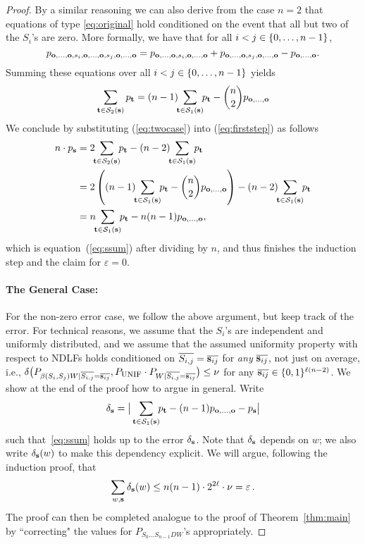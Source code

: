 \begin{proof}
By a similar reasoning we can also derive
from the case $n=2$ that equations of type \eqref{eq:original} hold
conditioned on the event that all but two of the $S_i$'s are zero. More
formally, we have that for all $i < j \in \{0,\ldots,n-1\}$,
\begin{equation}\label{eq:zeros}
p_{\text{\boldmath${\bf o}$},\ldots,\text{\boldmath${\bf o}$},s_i,\text{\boldmath${\bf o}$},\ldots,\text{\boldmath${\bf o}$},s_j,\text{\boldmath${\bf o}$},\ldots,\text{\boldmath${\bf o}$}} =
p_{\text{\boldmath${\bf o}$},\ldots,\text{\boldmath${\bf o}$},s_i,\text{\boldmath${\bf o}$},\ldots,\text{\boldmath${\bf o}$}} +
p_{\text{\boldmath${\bf o}$},\ldots,\text{\boldmath${\bf o}$},s_j,\text{\boldmath${\bf o}$},\ldots,\text{\boldmath${\bf o}$}} - p_{\text{\boldmath${\bf o}$},\ldots,\text{\boldmath${\bf o}$}}.
\end{equation}
Summing these equations over all $i < j \in \{0,\ldots,n-1\}$
yields
\begin{equation} \label{eq:twocase}
\sum_{\text{\boldmath${\bf t}$} \in {\cal S}_2(\text{\boldmath${\bf s}$})} p_{\text{\boldmath${\bf t}$}} = (n-1) \!\! \sum_{\text{\boldmath${\bf t}$} \in {\cal S}_1(\text{\boldmath${\bf s}$})} \!\! p_{\text{\boldmath${\bf t}$}} - {n \choose 2} p_{\text{\boldmath${\bf o}$},\ldots,\text{\boldmath${\bf o}$}}
\end{equation}
We conclude by substituting (\ref{eq:twocase}) into
(\ref{eq:firststep}) as follows
\begin{align*}
n \cdot p_{\bs} &= 2 \!\! \sum_{\b{t} \in \Stwo} \!\! p_{\b{t}} - (n-2) \!\! \sum_{\b{t} \in \Sone}
\!\! p_{\b{t}}\\
&= 2 \left( (n-1) \!\! \sum_{\b{t} \in \Sone} \!\! p_{\b{t}} - {n \choose 2}
  p_{\zero,\ldots,\zero} \right) - (n-2) \!\! \sum_{\b{t} \in \Sone} \!\! p_{\b{t}}\\
&= n \!\! \sum_{\b{t} \in \Sone} \!\! p_{\b{t}} - n (n-1) p_{\zero,\ldots,\zero},
\end{align*}
which is equation~(\ref{eq:ssum}) after dividing by $n$, and thus finishes
the induction step and the claim for $\varepsilon = 0$. 


\paragraph{\sc The General Case: }

For the non-zero error case, we follow the above argument, but keep
track of the error.  For technical reasons, we assume that the $S_i$'s
are independent and uniformly distributed, and we assume that the
assumed uniformity property with respect to 
NDLFs holds conditioned on
$\overline{S_{i,j}}=\overline{\text{\boldmath${\bf s}$}_{ij}}$ for {\em any}
$\overline{\text{\boldmath${\bf s}$}_{ij}}$, not just on average, i.e., $ \delta\big( P_{\beta(S_i,S_j) 
W | \overline{S_{i,j}} = \overline{\text{\boldmath${\bf s}$}_{ij}}} , P_{\mbox{\sc unif}} \cdot P_{W |
  \overline{S_{i,j}}=\overline{\text{\boldmath${\bf s}$}_{ij}} } \big) \leq \nu$ for any
$\overline{\text{\boldmath${\bf s}$}_{ij}} \in \{0,1\}^{\ell(n-2)}$.  We show at the end
of the proof how to argue in general.  Write
$$
\delta_{\text{\boldmath${\bf s}$}} = \big|\sum_{\text{\boldmath${\bf t}$} \in {\cal S}_1(\text{\boldmath${\bf s}$})} \!\! p_{\text{\boldmath${\bf t}$}} - (n-1)p_{\text{\boldmath${\bf o}$},\ldots,\text{\boldmath${\bf o}$}} - p_{\text{\boldmath${\bf s}$}}\big|
$$ 
such that~\eqref{eq:ssum} holds up to the error $\delta_{\text{\boldmath${\bf s}$}}$. Note that $\delta_{\text{\boldmath${\bf s}$}}$ depends on $w$; we also write $\delta_{\text{\boldmath${\bf s}$}}(w)$ to make this dependency explicit. We will argue, following the induction proof, that 
$$
\sum_{w,\text{\boldmath${\bf s}$}} \delta_{\text{\boldmath${\bf s}$}}(w) \leq n(n-1)\cdot2^{2\ell} \cdot \nu = \varepsilon \, .
$$ 
The proof can then be completed analogue to the proof of Theorem~\ref{thm:main} by ``correcting" the values for $P_{S_0 \ldots S_{n-1}DW}$'s appropriately. 


\end{proof}
